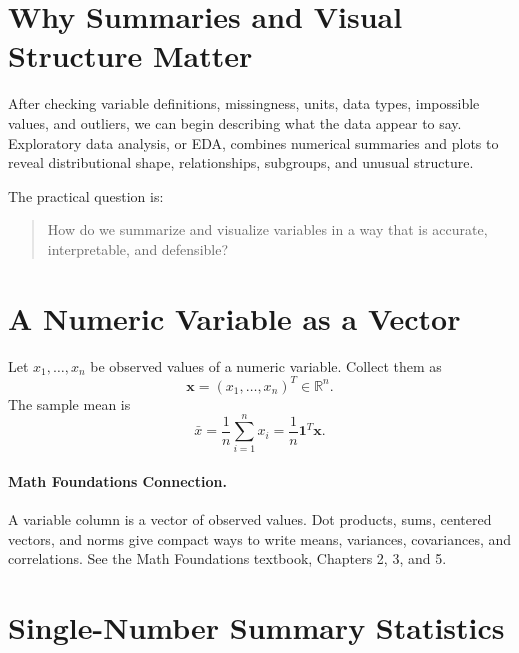 {
\section{Why Summaries and Visual Structure Matter}

After checking variable definitions, missingness, units, data types, impossible values, and outliers, we can begin describing what the data appear to say.  Exploratory data analysis, or EDA, combines numerical summaries and plots to reveal distributional shape, relationships, subgroups, and unusual structure.

The practical question is:
\begin{quote}
  How do we summarize and visualize variables in a way that is accurate, interpretable, and defensible?
\end{quote}

\section{A Numeric Variable as a Vector}

Let $x_1,\ldots,x_n$ be observed values of a numeric variable.  Collect them as
\begin{equation}
  \mathbf{x}=(x_1,\ldots,x_n)^T\in\mathbb{R}^n.
  \label{eq:ch4-data-vector}
\end{equation}
The sample mean is
\begin{equation}
  \bar{x}=\frac{1}{n}\sum_{i=1}^n x_i
  =\frac{1}{n}\mathbf{1}^T\mathbf{x}.
  \label{eq:ch4-sample-mean}
\end{equation}

\paragraph{Math Foundations Connection.}
A variable column is a vector of observed values.  Dot products, sums, centered vectors, and norms give compact ways to write means, variances, covariances, and correlations.  See the Math Foundations textbook, Chapters 2, 3, and 5.

\section{Single-Number Summary Statistics}

}
